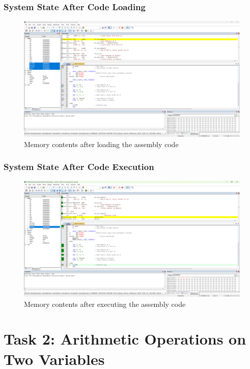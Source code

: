 \documentclass[12pt,a4paper]{article}
\begin{document}
\subsubsection{System State After Code Loading}
\begin{figure}[H]
    \centering
    \includegraphics[width=\textwidth]{ls1.png}
    \caption{Memory contents after loading the assembly code}
    \label{fig:loading1}
\end{figure}

\subsubsection{System State After Code Execution}
\begin{figure}[H]
    \centering
    \includegraphics[width=\textwidth]{es1.png}
    \caption{Memory contents after executing the assembly code}
    \label{fig:execution1}
\end{figure}

\section{Task 2: Arithmetic Operations on Two Variables}
\end{document}
